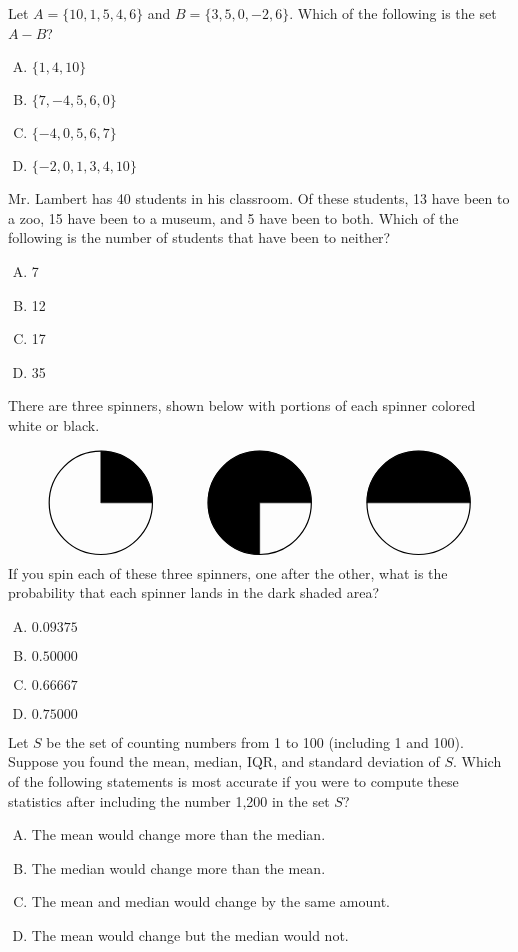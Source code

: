\documentclass[12pt,letterpaper]{exam}
\begin{document}
\begin{questions}
\question Let $A= \{ 10, 1, 5, 4, 6 \}$ and $B= \{ 3, 5, 0, -2, 6 \}$. Which of the following is the set $A - B$?
	\begin{enumerate}[A.]
	\item $\{ 1, 4, 10 \}$
	\item $\{ 7, -4, 5, 6, 0 \}$
	\item $\{ -4, 0, 5, 6, 7 \}$
	\item $\{ -2, 0, 1, 3, 4, 10 \}$
	\end{enumerate}

\question Mr. Lambert has 40 students in his classroom. Of these students, 13 have been to a zoo, 15 have been to a museum, and 5 have been to both. Which of the following is the number of students that have been to neither?
	\begin{enumerate}[A.]
	\item 7
	\item 12
	\item 17
	\item 35
	\end{enumerate} 

\question There are three spinners, shown below with portions of each spinner colored white or black.\par
	\[
	\begin{tikzpicture}
	\draw[line width=0.03cm] (0,0) circle (1.3);
	\draw[fill=black] (0,0) -- (1.3,0) arc[start angle=0, end angle=90,radius=1.3] -- (0,0);
	
	\draw[line width=0.03cm] (4,0) circle (1.3);
	\draw[fill=black] (4,0) -- (5.3,0) arc[start angle=0, end angle=270,radius=1.3] -- (4,0);

	\draw[line width=0.03cm] (8,0) circle (1.3);
	\draw[fill=black] (8,0) -- (9.3,0) arc[start angle=0, end angle=180,radius=1.3] -- (8,0);
	\end{tikzpicture} 
	\]
If you spin each of these three spinners, one after the other, what is the probability that each spinner lands in the dark shaded area?
	\begin{enumerate}[A.]
	\item $0.09375$
	\item $0.50000$
	\item $0.66667$
	\item $0.75000$
	\end{enumerate}

\question Let $S$ be the set of counting numbers from 1 to 100 (including 1 and 100). Suppose you found the mean, median, IQR, and standard deviation of $S$. Which of the following statements is most accurate if you were to compute these statistics after including the number 1,200 in the set $S$?
	\begin{enumerate}[A.]
	\item The mean would change more than the median.
	\item The median would change more than the mean.
	\item The mean and median would change by the same amount.
	\item The mean would change but the median would not.
	\end{enumerate}


\end{questions}
\end{document}
